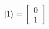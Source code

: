 \documentclass[preview]{standalone}
\begin{document}
\begin{align*}
| 1 \rangle = \begin{bmatrix} 0 \\ 1 \end{bmatrix}
\end{align*}
\end{document}
